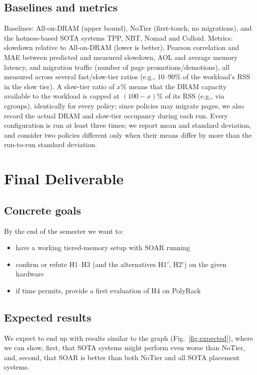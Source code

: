\documentclass[conference]{IEEEtran}
\begin{document}
\subsection{Baselines and metrics}
Baselines: All-on-DRAM (upper bound), NoTier (first-touch, no migrations),
and the hotness-based SOTA systems TPP, NBT, Nomad and Colloid.
Metrics: slowdown relative to All-on-DRAM (lower is better), Pearson
correlation and MAE between predicted and measured slowdown, AOL and average
memory latency, and migration traffic (number of page promotions/demotions),
all measured across several fast/slow-tier ratios (e.g., 10--90\% of the
workload's RSS in the slow tier). A slow-tier ratio of $x\%$ means that the
DRAM capacity available to the workload is capped at $(100-x)\%$ of its RSS
(e.g., via cgroups), identically for every policy; since policies may migrate
pages, we also record the actual DRAM and slow-tier occupancy during each run. Every configuration is run at least three
times; we report mean and standard deviation, and consider two policies
different only when their means differ by more than the run-to-run standard
deviation.

\section{Final Deliverable}
\label{sec:deliverable}

\subsection{Concrete goals}
By the end of the semester we want to:
\begin{itemize}
      \item have a working tiered-memory setup
with SOAR running
      \item confirm or refute H1--H3 (and the
alternatives H1$'$, H2$'$) on the given hardware
      \item if time permits, provide a
first evaluation of H4 on PolyRack
\end{itemize}

\subsection{Expected results}
We expect to end up with results similar to the graph (Fig.~\ref{fig:expected}), where we can show, first, that SOTA systems might perform even worse than NoTier, and, second, that SOAR is better than both NoTier and all SOTA placement systems.
\end{document}
